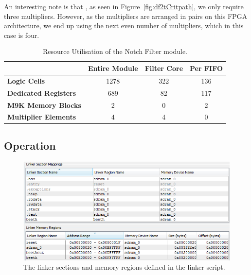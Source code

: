 \documentclass[]{article}
\begin{document}
An interesting note is that , as seen in Figure~\ref{fig:df2tCritpath}, we only require three multipliers. However, as the multipliers are arranged in pairs on this FPGA architecture, we end up using the next even number of multipliers, which in this case is four.

\begin{table}[tbp]
	\caption{Resource Utilisation of the Notch Filter module.}
	\label{tab:resource_util_notch}
	\begin{center}
		\begin{tabular}{l|ccc}
		\hline

		\hline
											& \textbf{Entire Module} 	& \textbf{Filter Core} 	& \textbf{Per FIFO}\\
		\hline
			\textbf{Logic Cells} 			& 1278 						& 322 					& 136 \\
		\hline
			\textbf{Dedicated Registers}	& 689						& 82 					& 117 \\
		\hline
			\textbf{M9K Memory Blocks}		& 2							& 0 					& 2 \\
		\hline
			\textbf{Multiplier Elements}	& 4							& 4 					& 0 \\
		\hline

		\hline
		\end{tabular}
	\end{center}
\end{table}


\subsection{Operation} %
\label{sub:operation}

\begin{figure}[btp]
	\begin{center}
		\includegraphics[width = \textwidth]{linkersections.PNG}
	\end{center}
	\caption{The linker sections and memory regions defined in the linker script.}
	\label{fig:linkersections}
\end{figure}
\end{document}
